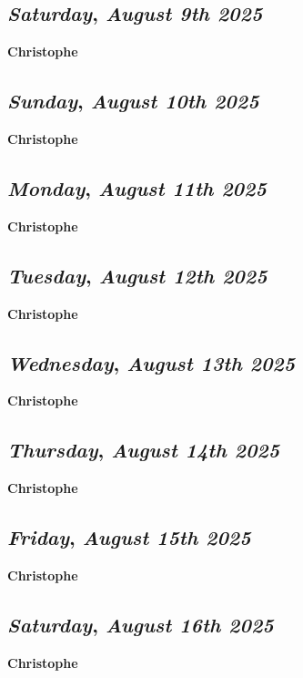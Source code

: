 \def\day{\textit{August 9th 2025}}
\def\weekday{\textit{Saturday}}
\subsection*{\weekday, \day}
\textbf {Christophe}

\def\day{\textit{August 10th 2025}}
\def\weekday{\textit{Sunday}}
\subsection*{\weekday, \day}
\textbf {Christophe}

\def\day{\textit{August 11th 2025}}
\def\weekday{\textit{Monday}}
\subsection*{\weekday, \day}
\textbf {Christophe}

\def\day{\textit{August 12th 2025}}
\def\weekday{\textit{Tuesday}}
\subsection*{\weekday, \day}
\textbf {Christophe}

\def\day{\textit{August 13th 2025}}
\def\weekday{\textit{Wednesday}}
\subsection*{\weekday, \day}
\textbf {Christophe}

\def\day{\textit{August 14th 2025}}
\def\weekday{\textit{Thursday}}
\subsection*{\weekday, \day}
\textbf {Christophe}

\def\day{\textit{August 15th 2025}}
\def\weekday{\textit{Friday}}
\subsection*{\weekday, \day}
\textbf {Christophe}

\def\day{\textit{August 16th 2025}}
\def\weekday{\textit{Saturday}}
\subsection*{\weekday, \day}
\textbf {Christophe}

\def\day{\textit{August 17th 2025}}
\def\weekday{\textit{Sunday}}
